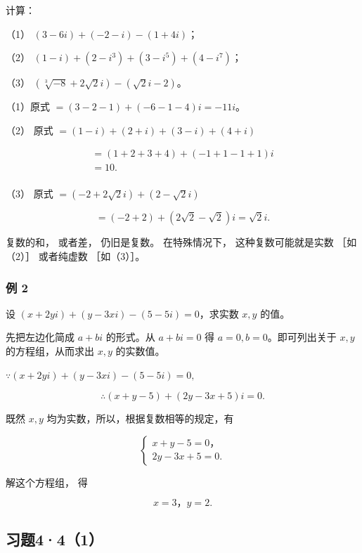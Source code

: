 计算：

（1） \((3-6i)+(-2-i)-(1+4i)\)；

（2） \((1 - i) + (2 - i^3) + (3 - i^5) + (4 - i^7)\)；

（3） \((\sqrt[3]{-8} + 2\sqrt{2} i) - (\sqrt{2} i - 2)\)。

 （1）原式 \(=(3-2-1)+(-6-1-4)i=-11i\)。

（2） 原式 \(= (1 - i) + (2 + i) + (3 - i) + (4 + i)\)

\[
\begin{array}{l} = (1 + 2 + 3 + 4) + (- 1 + 1 - 1 + 1) i \\ = 10. \\ \end{array}
\]

（3） 原式 \(= (-2 + 2\sqrt{2}i) + (2 - \sqrt{2}i)\)

\[
= (- 2 + 2) + (2 \sqrt {2} - \sqrt {2}) i = \sqrt {2} i.
\]

 复数的和， 或者差， 仍旧是复数。 在特殊情况下，
这种复数可能就是实数 ［如（2）］ 或者纯虚数 ［如（3）］。

\subsubsection{例 2}

设 \((x + 2yi) + (y - 3xi) - (5 - 5i) = 0\)，求实数 \(x, y\) 的值。

 先把左边化简成 \(a + b i\) 的形式。从 \(a+bi=0\) 得
\(a = 0, b = 0\)。即可列出关于 \(x, y\) 的方程组，从而求出 \(x, y\)
的实数值。

 \(\because (x + 2yi) + (y - 3xi) - (5 - 5i) = 0,\)

\[
\therefore (x + y - 5) + (2 y - 3 x + 5) i = 0.
\]

既然 \(x, y\) 均为实数，所以，根据复数相等的规定，有

\[
\left\{ \begin{array}{l} x + y - 5 = 0\text{，} \\ 2 y - 3 x + 5 = 0. \end{array} \right.
\]

解这个方程组， 得

\[
x = 3\text{，} y = 2.
\]

\subsection{习题4·4（1）}

